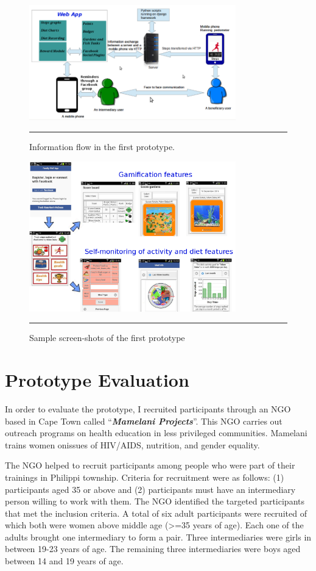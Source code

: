 \begin{figure}[htbp]
  \centering
    \includegraphics[width=0.8\textwidth]{Figures/prototype_1.png}
    \rule{35em}{0.5pt}
  \caption{Information flow in the first prototype.}
  \label{figure:prototype_1}
\end{figure}

\begin{figure}[htbp]
  \centering
    \includegraphics[width=0.8\textwidth]{Figures/Version1/Prototype1Screenshots.png}
    \rule{35em}{0.5pt}
  \caption{Sample screen-shots of the first prototype}
  \label{figure:prototype_1_screens}
\end{figure}
\section{Prototype Evaluation}
In order to evaluate the prototype, I recruited participants through an NGO
based in Cape Town called ``\textbf{\textit{Mamelani Projects}}''. This NGO
carries out outreach programs on health education in less privileged
communities. Mamelani trains women onissues of HIV/AIDS, nutrition, and gender equality. 

The NGO helped to recruit participants among people who were part of their trainings in Philippi township. Criteria for recruitment were as follows: (1) participants aged 35 or above and (2) participants must have an intermediary person willing to work with them. The NGO identified the targeted participants that met the inclusion criteria. A total of six adult participants were recruited of which both were women above middle age (>=35 years of age). Each one of the adults brought one intermediary to form a pair. Three intermediaries were girls in between 19-23 years of age. The remaining three intermediaries were boys aged between 14 and 19 years of age. 


